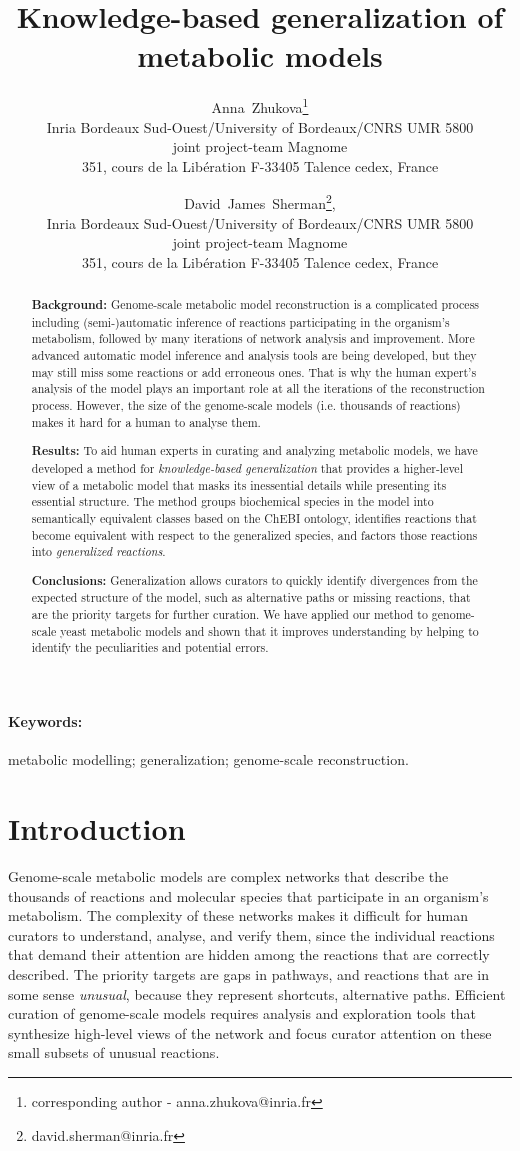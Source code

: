 \documentclass[9pt]{article}
\title{Knowledge-based generalization of metabolic models}
\author{Anna~Zhukova\thanks{corresponding author - anna.zhukova@inria.fr}\\ Inria Bordeaux Sud-Ouest/University of Bordeaux/CNRS UMR 5800\\
joint project-team Magnome\\
351, cours de la Lib\'{e}ration F-33405 Talence cedex, France
        \and David~James~Sherman\thanks{david.sherman@inria.fr}, \\ Inria Bordeaux Sud-Ouest/University of Bordeaux/CNRS UMR 5800\\
        joint project-team Magnome\\
351, cours de la Lib\'{e}ration F-33405 Talence cedex, France}
\date{}
\begin{document}
\maketitle
\newpage

\begin{abstract}
{\bf Background:} Genome-scale metabolic model reconstruction is a complicated process including (semi-)automatic inference of reactions participating in the organism's metabolism, followed by many iterations of network analysis and improvement. More advanced automatic model inference and analysis tools are being developed, but they may still miss some reactions or add erroneous ones. That is why the human expert's analysis of the model plays an important role at all the iterations of the reconstruction process. However, the size of the genome-scale models (i.e. thousands of reactions) makes it hard for a human to analyse them.

{\bf Results:} To aid human experts in curating and analyzing metabolic models, we have developed a method for \emph{knowledge-based generalization} that provides a higher-level view of a metabolic model that masks its inessential details while presenting its essential structure. The method groups biochemical species in the model into semantically equivalent classes based on the ChEBI ontology, identifies reactions that become equivalent with respect to the generalized species, and factors those reactions into \emph{generalized reactions}.

{\bf Conclusions:} Generalization allows curators to quickly identify divergences from the expected structure of the model, such as alternative paths or missing reactions, that are the priority targets for further curation.
We have applied our method to genome-scale yeast metabolic models and shown that it improves understanding by helping to identify the peculiarities and potential errors.      
\end{abstract}

\paragraph*{Keywords:} metabolic modelling; generalization; genome-scale reconstruction.

\newpage
\section*{Introduction}
Genome-scale metabolic models are complex networks that describe the thousands of reactions and molecular species that participate in an organism's metabolism.
The complexity of these networks makes it difficult for human curators to understand, analyse, and verify them, since the individual reactions that demand their attention are hidden among the reactions that are correctly described. The priority targets are gaps in pathways, and reactions that are in some sense \emph{unusual}, because they represent shortcuts, alternative paths.
Efficient curation of genome-scale models requires analysis and exploration tools that synthesize high-level views of the network and focus curator attention on these small subsets of unusual reactions.
\end{document}
